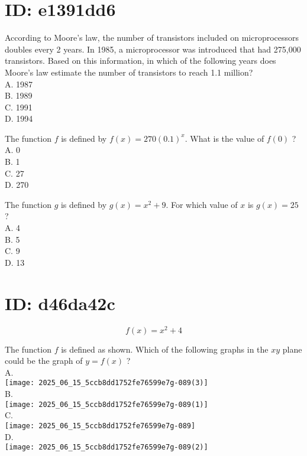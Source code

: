 \section*{ID: e1391dd6}
According to Moore's law, the number of transistors included on microprocessors doubles every 2 years. In 1985, a microprocessor was introduced that had 275,000 transistors. Based on this information, in which of the following years does Moore's law estimate the number of transistors to reach 1.1 million?\\
A. 1987\\
B. 1989\\
C. 1991\\
D. 1994

The function $f$ is defined by $f(x)=270(0.1)^{x}$. What is the value of $f(0)$ ?\\
A. 0\\
B. 1\\
C. 27\\
D. 270

The function $g$ is defined by $g(x)=x^{2}+9$. For which value of $x$ is $g(x)=25$ ?\\
A. 4\\
B. 5\\
C. 9\\
D. 13

\section*{ID: d46da42c}
$$
f(x)=x^{2}+4
$$

The function $f$ is defined as shown. Which of the following graphs in the $x y$ plane could be the graph of $y=f(x)$ ?\\
A.\\
\texttt{[image: 2025\_06\_15\_5ccb8dd1752fe76599e7g-089(3)]}\\
B.\\
\texttt{[image: 2025\_06\_15\_5ccb8dd1752fe76599e7g-089(1)]}\\
C.\\
\texttt{[image: 2025\_06\_15\_5ccb8dd1752fe76599e7g-089]}\\
D.\\
\texttt{[image: 2025\_06\_15\_5ccb8dd1752fe76599e7g-089(2)]}

